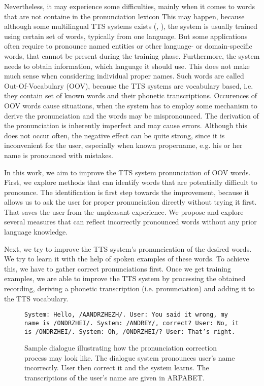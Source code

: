 Nevertheless, it may experience some difficulties, mainly when it comes to words that are not containe in the pronunciation lexicon
This may happen, because although some multilingual TTS systems exists (\cite{sproat1997multilingual}, \cite{miro2009multilingual}), the system is usually trained using certain set of words, typically from one language.
But some applications often require to pronounce named entities or other language- or domain-specific words, that cannot be present during the training phase.
Furthermore, the system needs to obtain information, which language it should use.
This does not make much sense when considering individual proper names.
Such words are called Out-Of-Vocabulary (OOV), because the TTS systems are vocabulary based, i.e. they contain set of known words and their phonetic transcriptions.
Occurences of OOV words cause situations, when the system has to employ some mechanism to derive the pronunciation and the words may be mispronounced.
The derivation of the pronunciation is inherently imperfect and may cause errors.
Although this does not occur often, the negative effect can be quite strong, since it is inconvenient for the user, especially when known propername, e.g. his or her name is pronounced with mistakes.
\par
In this work, we aim to improve the TTS system pronunciation of OOV words.
First, we explore methods that can identify words that are potentially difficult to pronounce.
The identification is first step towards the improvement, because it allows us to ask the user for proper pronunciation directly without trying it first.
That saves the user from the unpleasant experience.
We propose and explore several measures that can reflect incorrectly pronounced words without any prior language knowledge.
\par
Next, we try to improve the TTS system's pronuncication of the desired words.
We try to learn it with the help of spoken examples of these words.
To achieve this, we have to gather correct pronunciations first.
Once we get training examples, we are able to improve the TTS system by processing the obtained recording, deriving a phonetic transcription (i.e. pronunciation) and adding it to the TTS vocabulary.
\par
\begin{center}
\begin{figure}[h]
\texttt{System: Hello, /AANDRZHEZH/.\linebreak
User: You said it wrong, my name is /ONDRZHEI/.\linebreak
System: /ANDREY/, correct?\linebreak
User: No, it is /ONDRZHEI/.\linebreak
System: Oh, /ONDRZHEI/?\linebreak
User: That's right.
}
\caption{Sample dialogue illustrating how the pronunciation correction process may look like. The dialogue system pronounces user's name incorrectly. User then correct it and the system learns. The transcriptions of the user's name are given in ARPABET.}
\label{dialogsample}
\end{figure}
\end{center}

